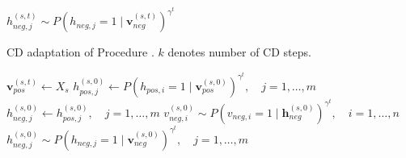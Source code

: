 \begin{algorithm}
\begin{algorithmic}[1]
				\State $h_{neg,j}^{(s,t)} \sim P(h_{neg,j} = 1 \mid \mathbf{v}_{neg}^{(s,t)})^{\gamma^t}$
			\EndFor
		\EndFor
	\EndFor
\EndProcedure
\end{algorithmic}
\end{algorithm}

\begin{algorithm}
\caption{CD adaptation of Procedure \label{alg:cd}. $k$ denotes number of CD steps.}
\begin{algorithmic}[1]
		\State $\mathbf{v}_{pos}^{(s,t)} \gets X_s$ 
		\State $h_{pos,j}^{(s,0)} \gets P(h_{pos,i} = 1 \mid \mathbf{v}_{pos}^{(s,0)})^{\gamma^t}, \quad j=1,\dots,m$ 
		\State $h_{neg,j}^{(s,0)} \gets h_{pos,j}^{(s,0)}, \quad j=1,\dots,m$  
			\State $v_{neg,i}^{(s,0)} \sim P(v_{neg,i} = 1 \mid \mathbf{h}_{neg}^{(s,0)})^{\gamma^t}, \quad i=1,\dots,n$ 
			\State $h_{neg,j}^{(s,0)} \sim P(h_{neg,j} = 1 \mid \mathbf{v}_{neg}^{(s,0)})^{\gamma^t}, \quad j=1,\dots,m$ 
		\EndFor
\end{algorithmic}
\end{algorithm}